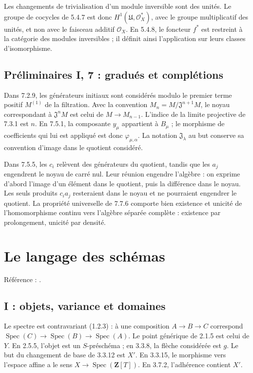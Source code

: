 \documentclass[11pt,a4paper]{article}
\begin{document}
Les changements de trivialisation d'un module inversible sont des
unités. Le groupe de cocycles de 5.4.7 est donc
$H^1(\mathfrak U,\mathcal O_X^*)$, avec le groupe multiplicatif des
unités, et non avec le faisceau additif $\mathcal O_X$.
En 5.4.8, le foncteur $f^*$ est restreint à la catégorie des modules
inversibles ; il définit ainsi l'application sur leurs classes
d'isomorphisme.

\subsection{Préliminaires I, 7 : gradués et complétions}
\label{note:base0-completion}
Dans 7.2.9, les générateurs initiaux sont considérés modulo le premier
terme positif $M^{(1)}$ de la filtration. Avec la convention
$M_n=M/\mathfrak J^{n+1}M$, le noyau correspondant à
$\mathfrak J^nM$ est celui de $M\to M_{n-1}$.
L'indice de la limite projective de 7.3.1 est $n$.
En 7.5.1, la composante $y_\mu$ appartient à $B_\mu$ ; le morphisme
de coefficients qui lui est appliqué est donc $\varphi_{\mu,\alpha}$.
La notation $\mathfrak J_\lambda$ au but conserve sa convention
d'image dans le quotient considéré.

Dans 7.5.5, les $c_i$ relèvent des générateurs du quotient, tandis
que les $a_j$ engendrent le noyau de carré nul. Leur réunion engendre
l'algèbre : on exprime d'abord l'image d'un élément dans le quotient,
puis la différence dans le noyau. Les seuls produits $c_ia_j$
resteraient dans le noyau et ne pourraient engendrer le quotient.
La propriété universelle de 7.7.6 comporte bien existence et unicité
de l'homomorphisme continu vers l'algèbre séparée complète : existence
par prolongement, unicité par densité.
\par

\section{Le langage des schémas}
\label{part:base1}
Référence : \cite{EGAI}.
\subsection{I : objets, variance et domaines}
\label{note:base1-functorial}
Le spectre est contravariant (1.2.3) : à une composition
$A\to B\to C$ correspond $\operatorname{Spec}(C)\to
\operatorname{Spec}(B)\to\operatorname{Spec}(A)$.
Le point générique de 2.1.5 est celui de $Y$.
En 2.5.5, l'objet est un $S$-préschéma ; en 3.3.8, la flèche considérée
est $g$. Le but du changement de base de 3.3.12 est $X'$.
En 3.3.15, le morphisme vers l'espace affine a le sens
$X\to\operatorname{Spec}(\mathbf Z[T])$.
En 3.7.2, l'adhérence contient $X'$.
\end{document}
